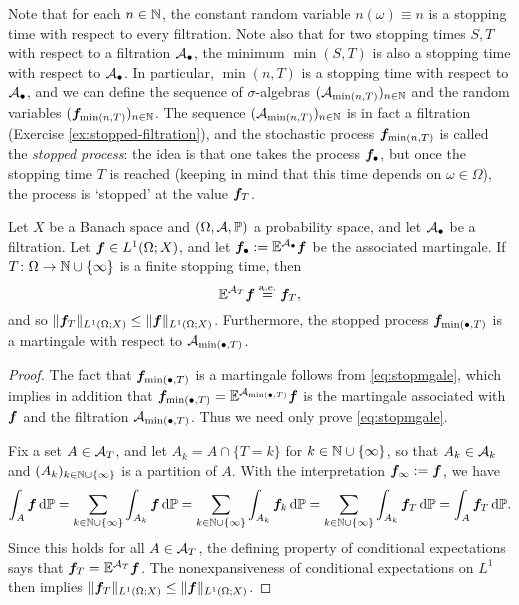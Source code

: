Note that for each $n \in \mathbb{N}$, the constant random variable $n(\omega) \equiv n$ is a stopping time with respect to every filtration.
Note also that for two stopping times $S,T$ with respect to a filtration $\mathcal{A}_{\bullet}$, the minimum $\min(S,T)$ is also a stopping time with respect to $\mathcal{A}_{\bullet}$.
In particular, $\min(n,T)$ is a stopping time with respect to $\mathcal{A}_{\bullet}$, and we can define the sequence of $\sigma$-algebras $(\mathcal{A}_{\min(n,T)})_{n \in \mathbb{N}}$ and the random variables $(\bm{f}_{\min(n,T)})_{n \in \mathbb{N}}$.
The sequence $(\mathcal{A}_{\min(n,T)})_{n \in \mathbb{N}}$ is in fact a filtration (Exercise \ref{ex:stopped-filtration}), and the stochastic process $\bm{f}_{\min(n,T)}$ is called the \emph{stopped process}: the idea is that one takes the process $\bm{f}_{\bullet}$, but once the stopping time $T$ is reached (keeping in mind that this time depends on $\omega \in \Omega$), the process is `stopped' at the value $\bm{f}_{T}$.

\begin{prop}\label{prop:stopped-martingale}
  Let $X$ be a Banach space and $(\Omega,\mathcal{A},\mathbb{P})$ a probability space, and let $\mathcal{A}_{\bullet}$ be a filtration.
  Let $\bm{f} \in L^1(\Omega;X)$, and let $\bm{f}_{\bullet} := \mathbb{E}^{\mathcal{A}_{\bullet}} \bm{f}$ be the associated martingale. 
  If $T \colon \Omega \rightarrow \mathbb{N} \cup \{\infty\}$ is a finite stopping time, then
  \begin{equation}\label{eq:stopmgale}
    \mathbb{E}^{\mathcal{A}_{T}} \bm{f} \stackrel{\mathrm{a.e.}}{=} \bm{f}_{T},
  \end{equation}
  and so $\|\bm{f}_{T}\|_{L^1(\Omega;X)} \leq \|\bm{f}\|_{L^1(\Omega;X)}$.
  Furthermore, the stopped process $\bm{f}_{\min(\bullet,T)}$ is a martingale with respect to $\mathcal{A}_{\min(\bullet,T)}$.
\end{prop}

\begin{proof}
  The fact that $\bm{f}_{\min(\bullet,T)}$ is a martingale follows from \eqref{eq:stopmgale}, which implies in addition that $\bm{f}_{\min(\bullet,T)} = \mathbb{E}^{\mathcal{A}_{\min(\bullet,T)}} \bm{f}$ is the martingale associated with $\bm{f}$ and the filtration $\mathcal{A}_{\min(\bullet,T)}$.
  Thus we need only prove \eqref{eq:stopmgale}.
  
  Fix a set $A \in \mathcal{A}_{T}$, and let $A_{k} = A \cap \{T = k\}$ for $k \in \mathbb{N} \cup \{\infty\}$, so that $A_{k} \in \mathcal{A}_{k}$ and $(A_{k})_{k \in \mathbb{N} \cup \{\infty\}}$ is a partition of $A$.
  With the interpretation $\bm{f}_{\infty} := \bm{f}$, we have
  \begin{equation*}
      \int_{A} \bm{f} \, \mathrm{d} \mathbb{P} 
      = \sum_{k \in \mathbb{N} \cup \{\infty\}} \int_{A_k} \bm{f} \, \mathrm{d} \mathbb{P} 
      = \sum_{k \in \mathbb{N} \cup \{\infty\}} \int_{A_{k}} \bm{f}_{k} \, \mathrm{d} \mathbb{P} 
      = \sum_{k \in \mathbb{N} \cup \{\infty\}} \int_{A_{k}} \bm{f}_{T} \, \mathrm{d} \mathbb{P} 
      = \int_{A} \bm{f}_{T} \, \mathrm{d} \mathbb{P}.
  \end{equation*}
  Since this holds for all $A \in \mathcal{A}_{T}$, the defining property of conditional expectations says that $\bm{f}_{T} = \mathbb{E}^{\mathcal{A}_{T}} \bm{f}$.
  The nonexpansiveness of conditional expectations on $L^1$ then implies $\|\bm{f}_{T}\|_{L^1(\Omega;X)} \leq \|\bm{f}\|_{L^1(\Omega;X)}$.
\end{proof}

